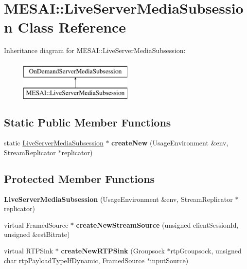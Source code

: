 \hypertarget{class_m_e_s_a_i_1_1_live_server_media_subsession}{}\section{M\+E\+S\+AI\+:\+:Live\+Server\+Media\+Subsession Class Reference}
\label{class_m_e_s_a_i_1_1_live_server_media_subsession}
Inheritance diagram for M\+E\+S\+AI\+:\+:Live\+Server\+Media\+Subsession\+:\begin{figure}[H]
\begin{center}
\leavevmode
\includegraphics[height=2.000000cm]{dc/da6/class_m_e_s_a_i_1_1_live_server_media_subsession}
\end{center}
\end{figure}
\subsection*{Static Public Member Functions}
\begin{DoxyCompactItemize}
\item 
\mbox{\label{class_m_e_s_a_i_1_1_live_server_media_subsession_a0716032b55129b1e4984639fc16547af}} 
static \hyperlink{class_m_e_s_a_i_1_1_live_server_media_subsession}{Live\+Server\+Media\+Subsession} $\ast$ {\bfseries create\+New} (Usage\+Environment \&env, Stream\+Replicator $\ast$replicator)
\end{DoxyCompactItemize}
\subsection*{Protected Member Functions}
\begin{DoxyCompactItemize}
\item 
\mbox{\label{class_m_e_s_a_i_1_1_live_server_media_subsession_a5a9d199f93db95b19a94cf8eb907e84b}} 
{\bfseries Live\+Server\+Media\+Subsession} (Usage\+Environment \&env, Stream\+Replicator $\ast$replicator)
\item 
\mbox{\label{class_m_e_s_a_i_1_1_live_server_media_subsession_aa4c2bcbe72dddfd276c525ee2b78affa}} 
virtual Framed\+Source $\ast$ {\bfseries create\+New\+Stream\+Source} (unsigned client\+Session\+Id, unsigned \&est\+Bitrate)
\item 
\mbox{\label{class_m_e_s_a_i_1_1_live_server_media_subsession_a2fdbf5406c45a25679279a13e8f3eb21}} 
virtual R\+T\+P\+Sink $\ast$ {\bfseries create\+New\+R\+T\+P\+Sink} (Groupsock $\ast$rtp\+Groupsock, unsigned char rtp\+Payload\+Type\+If\+Dynamic, Framed\+Source $\ast$input\+Source)
\end{DoxyCompactItemize}
